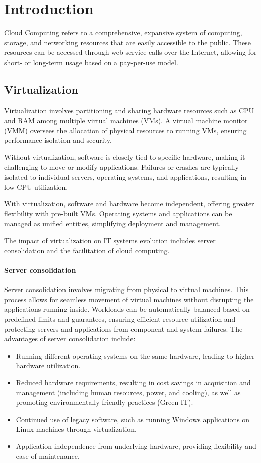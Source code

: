 \section{Introduction}

Cloud Computing refers to a comprehensive, expansive system of computing, storage, and networking resources that are easily accessible to the public. 
These resources can be accessed through web service calls over the Internet, allowing for short- or long-term usage based on a pay-per-use model.

\subsection{Virtualization}
Virtualization involves partitioning and sharing hardware resources such as CPU and RAM among multiple virtual machines (VMs). 
A virtual machine monitor (VMM) oversees the allocation of physical resources to running VMs, ensuring performance isolation and security.

Without virtualization, software is closely tied to specific hardware, making it challenging to move or modify applications. 
Failures or crashes are typically isolated to individual servers, operating systems, and applications, resulting in low CPU utilization.

With virtualization, software and hardware become independent, offering greater flexibility with pre-built VMs. 
Operating systems and applications can be managed as unified entities, simplifying deployment and management.

The impact of virtualization on IT systems evolution includes server consolidation and the facilitation of cloud computing.

\paragraph*{Server consolidation}
Server consolidation involves migrating from physical to virtual machines. 
This process allows for seamless movement of virtual machines without disrupting the applications running inside. 
Workloads can be automatically balanced based on predefined limits and guarantees, ensuring efficient resource utilization and protecting servers and applications from component and system failures.
The advantages of server consolidation include:
\begin{itemize}
    \item Running different operating systems on the same hardware, leading to higher hardware utilization.
    \item Reduced hardware requirements, resulting in cost savings in acquisition and management (including human resources, power, and cooling), as well as promoting environmentally friendly practices (Green IT).
    \item Continued use of legacy software, such as running Windows applications on Linux machines through virtualization.
    \item Application independence from underlying hardware, providing flexibility and ease of maintenance.
\end{itemize}